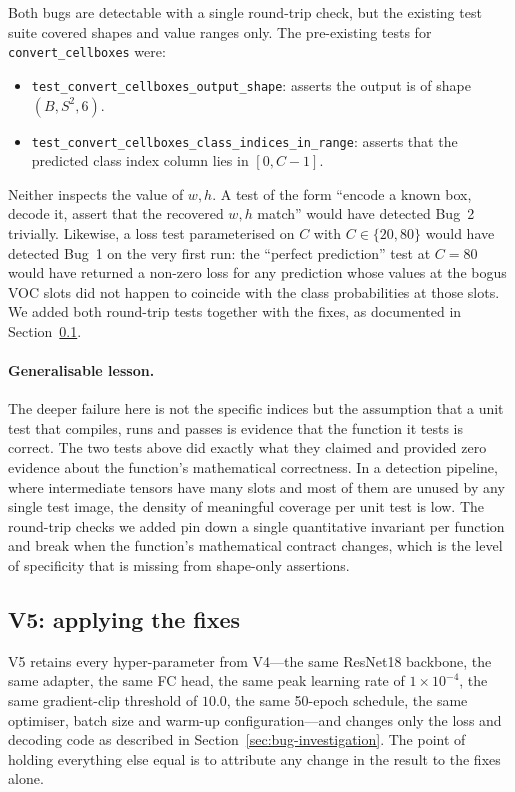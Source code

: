 Both bugs are detectable with a single round-trip check, but the existing test
suite covered shapes and value ranges only. The pre-existing tests for
\texttt{convert\_cellboxes} were:
\begin{itemize}
    \item \texttt{test\_convert\_cellboxes\_output\_shape}: asserts the output
        is of shape $(B, S^2, 6)$.
    \item \texttt{test\_convert\_cellboxes\_class\_indices\_in\_range}: asserts
        that the predicted class index column lies in $[0, C-1]$.
\end{itemize}

\noindent Neither inspects the value of $w, h$. A test of the form ``encode a
known box, decode it, assert that the recovered $w, h$ match'' would have
detected Bug~2 trivially. Likewise, a loss test parameterised on $C$ with
$C \in \{20, 80\}$ would have detected Bug~1 on the very first run: the
``perfect prediction'' test at $C=80$ would have returned a non-zero loss for
any prediction whose values at the bogus VOC slots did not happen to coincide
with the class probabilities at those slots. We added both round-trip tests
together with the fixes, as documented in
Section~\ref{sec:experiments:v5}.

\paragraph{Generalisable lesson.} The deeper failure here is not the specific
indices but the assumption that a unit test that compiles, runs and passes
is evidence that the function it tests is correct. The two tests above did
exactly what they claimed and provided zero evidence about the function's
mathematical correctness. In a detection pipeline, where intermediate tensors
have many slots and most of them are unused by any single test image, the
density of meaningful coverage per unit test is low. The round-trip checks
we added pin down a single quantitative invariant per function and break
when the function's mathematical contract changes, which is the level of
specificity that is missing from shape-only assertions.

\subsection{V5: applying the fixes}
\label{sec:experiments:v5}

V5 retains every hyper-parameter from V4---the same ResNet18 backbone, the
same adapter, the same FC head, the same peak learning rate of
$1\!\times\!10^{-4}$, the same gradient-clip threshold of $10.0$, the same
50-epoch schedule, the same optimiser, batch size and warm-up
configuration---and changes only the loss and decoding code as described in
Section~\ref{sec:bug-investigation}. The point of holding everything else
equal is to attribute any change in the result to the fixes alone.

